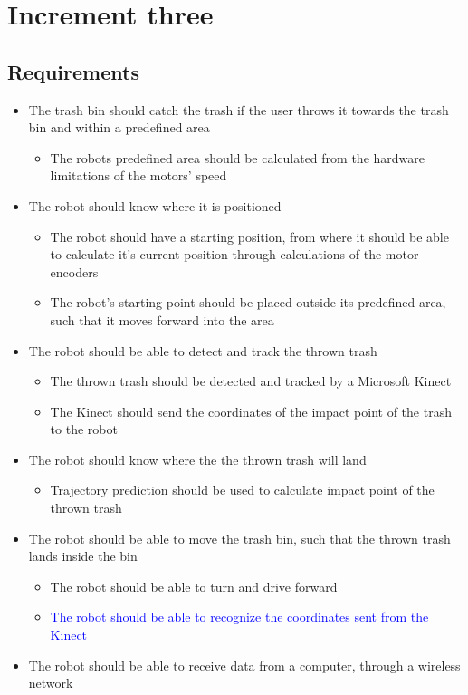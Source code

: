 \chapter{Increment three}
\label{chap:Increment three}

\section{Requirements}
\label{sec:i3Requirements}

\begin{itemize}
	\item The trash bin should catch the trash if the user throws it towards the trash bin and within a predefined area
	\begin{itemize}
		\item {The robots predefined area should be calculated from the hardware limitations of the motors’ speed}
	\end{itemize}
	\item The robot should know where it is positioned
	\begin{itemize}
		\item {The robot should have a starting position, from where it should be able to calculate it's current position through calculations of the motor encoders}
		\item {The robot's starting point should be placed outside its predefined area, such that it moves forward into the area}
	\end{itemize}
	\item The robot should be able to detect and track the thrown trash
	\begin{itemize}
		\item {The thrown trash should be detected and tracked by a Microsoft Kinect}
		\item {The Kinect should send the coordinates of the impact point of the trash to the robot}
	\end{itemize}
	\item The robot should know where the the thrown trash will land
	\begin{itemize}
		\item {Trajectory prediction should be used to calculate impact point of the thrown trash}
	\end{itemize}
	\item The robot should be able to move the trash bin, such that the thrown trash lands inside the bin
	\begin{itemize}
		\item {The robot should be able to turn and drive forward}
		\item\textcolor{blue}{The robot should be able to recognize the coordinates sent from the Kinect}
	\end{itemize}
	\item {The robot should be able to receive data from a computer, through a wireless network}
\end{itemize}

